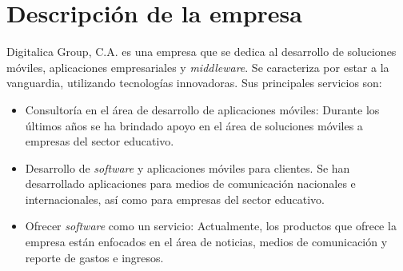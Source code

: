 \section{Descripción de la empresa} \label{Descripcion de la empresa}

Digitalica Group, C.A. es una empresa que se dedica al desarrollo de soluciones móviles, aplicaciones empresariales y \textit{middleware}. Se caracteriza por estar a la vanguardia, utilizando tecnologías innovadoras\cite{DIG1}. Sus principales servicios son:

\begin{itemize}
\item Consultoría en el área de desarrollo de aplicaciones móviles: Durante los últimos años se ha brindado apoyo en el área de soluciones móviles a empresas del sector educativo.
\item Desarrollo de \textit{software} y aplicaciones móviles para clientes. Se han desarrollado aplicaciones para medios de comunicación nacionales e internacionales, así como para empresas del sector educativo.
\item Ofrecer \textit{software} como un servicio: Actualmente, los productos que ofrece la empresa están enfocados en el área de noticias, medios de comunicación y reporte de gastos e ingresos. 
\end{itemize}
